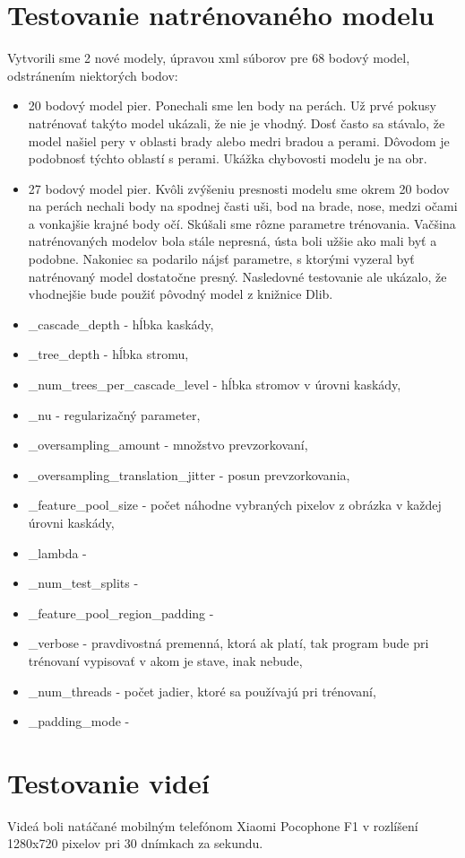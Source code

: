 \section{Testovanie natrénovaného modelu}\label{testovanieModelu}
Vytvorili sme 2 nové modely, úpravou xml súborov pre 68 bodový model, odstránením niektorých bodov:
\begin{itemize}
	\item 20 bodový model pier. 
	Ponechali sme len body na perách. 
	Už prvé pokusy natrénovať takýto model ukázali, že nie je vhodný.
	Dosť často sa stávalo, že model našiel pery v oblasti brady alebo medri bradou a perami.
	Dôvodom je podobnosť týchto oblastí s perami. Ukážka chybovosti modelu je na obr. 
	\item 27 bodový model pier.
	Kvôli zvýšeniu presnosti modelu sme okrem 20 bodov na perách nechali body na spodnej časti uši, bod na brade, nose, medzi očami a vonkajšie krajné body očí.
	Skúšali sme rôzne parametre trénovania. 
	Vačšina natrénovaných modelov bola stále nepresná, ústa boli užšie ako mali byť a podobne.
	Nakoniec sa podarilo nájsť parametre, s ktorými vyzeral byť natrénovaný model dostatočne presný.
	Nasledovné testovanie ale ukázalo, že vhodnejšie bude použiť pôvodný model z knižnice Dlib.
\end{itemize}

 \begin{itemize}
\item \_cascade\_depth - hĺbka kaskády,
\item \_tree\_depth - hĺbka stromu, 
\item \_num\_trees\_per\_cascade\_level - hĺbka stromov v úrovni kaskády, 
\item \_nu - regularizačný parameter, 
\item \_oversampling\_amount - množstvo prevzorkovaní, 
\item \_oversampling\_translation\_jitter - posun prevzorkovania,
\item \_feature\_pool\_size - počet náhodne vybraných pixelov z obrázka v každej úrovni kaskády, 
\item \_lambda - 
\item \_num\_test\_splits - 
\item \_feature\_pool\_region\_padding - 
\item \_verbose - pravdivostná premenná, ktorá ak platí, tak program bude pri trénovaní vypisovať v akom je stave, inak nebude, 
\item \_num\_threads - počet jadier, ktoré sa používajú pri trénovaní, 
\item \_padding\_mode - 
\end{itemize} 
\section{Testovanie videí}
Videá boli natáčané mobilným telefónom Xiaomi Pocophone F1 v rozlíšení 1280x720 pixelov pri 30 dnímkach za sekundu. 
